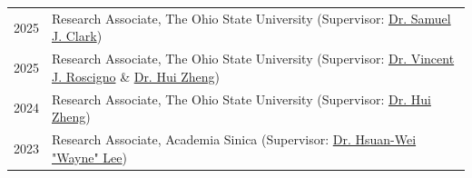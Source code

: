 
\begin{longtable}[l]{@{}p{} p{}}

    2025 & Research Associate, The Ohio State University (Supervisor: \href{https://www.samclark.net/}{Dr. Samuel J. Clark}) \\
    
    2025 & Research Associate, The Ohio State University (Supervisor: \href{https://u.osu.edu/roscigno.1/}{Dr. Vincent J. Roscigno} \& \href{https://www.huizhenghome.com/}{Dr. Hui Zheng}) \\

    2024 & Research Associate, The Ohio State University (Supervisor: \href{https://www.huizhenghome.com/}{Dr. Hui Zheng}) \\

    2023 & Research Associate, Academia Sinica (Supervisor: \href{https://sites.google.com/view/hsuanweilee/home}{Dr. Hsuan-Wei "Wayne" Lee}) \\

\end{longtable}